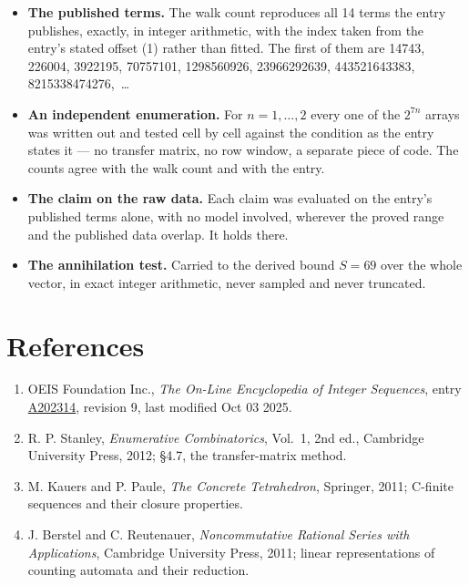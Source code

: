 \documentclass[11pt]{article}
\theoremstyle{definition}
\begin{document}
\begin{itemize}

\item {\bfseries The published terms.} The walk count reproduces all 14 terms the entry publishes, exactly, in integer arithmetic, with the index taken from the entry's stated offset (1) rather than fitted. The first of them are 14743, 226004, 3922195, 70757101, 1298560926, 23966292639, 443521643383, 8215338474276,~\dots

\item {\bfseries An independent enumeration.} For $n = 1,\dots,2$ every one of the $2^{7n}$ arrays was written out and tested cell by cell against the condition as the entry states it --- no transfer matrix, no row window, a separate piece of code. The counts agree with the walk count and with the entry.

\item {\bfseries The claim on the raw data.} Each claim was evaluated on the entry's published terms alone, with no model involved, wherever the proved range and the published data overlap. It holds there.

\item {\bfseries The annihilation test.} Carried to the derived bound $S = 69$ over the whole vector, in exact integer arithmetic, never sampled and never truncated.

\end{itemize}

\section{References}

\begin{enumerate}

\item OEIS Foundation Inc., \emph{The On-Line Encyclopedia of Integer Sequences}, entry \href{https://oeis.org/A202314}{A202314}, revision 9, last modified Oct 03 2025.

\item R. P. Stanley, \emph{Enumerative Combinatorics}, Vol.~1, 2nd ed., Cambridge University Press, 2012; \S4.7, the transfer-matrix method.

\item M. Kauers and P. Paule, \emph{The Concrete Tetrahedron}, Springer, 2011; C-finite sequences and their closure properties.

\item J. Berstel and C. Reutenauer, \emph{Noncommutative Rational Series with Applications}, Cambridge University Press, 2011; linear representations of counting automata and their reduction.

\end{enumerate}
\end{document}
